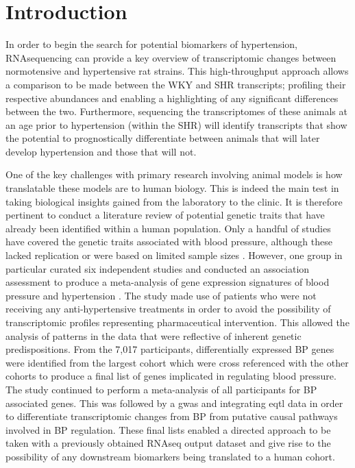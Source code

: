 \doublespacing

\section{Introduction}

In order to begin the search for potential biomarkers of hypertension, RNAsequencing can provide a key overview of transcriptomic changes between normotensive and hypertensive rat strains. This high-throughput approach allows a comparison to be made between the WKY and SHR transcripts; profiling their respective abundances and enabling a highlighting of any significant differences between the two. Furthermore, sequencing the transcriptomes of these animals at an age prior to hypertension (within the SHR) will identify transcripts that show the potential to prognostically differentiate between animals that will later develop hypertension and those that will not. 

One of the key challenges with primary research involving animal models is how translatable these models are to human biology. This is indeed the main test in taking biological insights gained from the laboratory to the clinic. It is therefore pertinent to conduct a literature review of potential genetic traits that have already been identified within a human population. Only a handful of studies have covered the genetic traits associated with blood pressure, although these lacked replication or were based on limited sample sizes \cite{Leonardson2010,Zeller2010,Bull2004,Korkor2011}. However, one group in particular curated six independent studies and conducted an association assessment to produce a meta-analysis of gene expression signatures of blood pressure and hypertension \cite{Huan2015}. The study made use of patients who were not receiving any anti-hypertensive treatments in order to avoid the possibility of transcriptomic profiles representing pharmaceutical intervention. This allowed the analysis of patterns in the data that were reflective of inherent genetic predispositions. From the 7,017 participants, differentially expressed BP genes were identified from the largest cohort which were cross referenced with the other cohorts to produce a final list of genes implicated in regulating blood pressure. The study continued to perform a meta-analysis of all participants for BP associated genes. This was followed by a \acrshort{gwas} and integrating \acrfull{eqtl} data in order to differentiate transcriptomic changes from BP from putative causal pathways involved in BP regulation. These final lists enabled a directed approach to be taken with a previously obtained RNAseq output dataset and give rise to the possibility of any downstream biomarkers being translated to a human cohort. 

